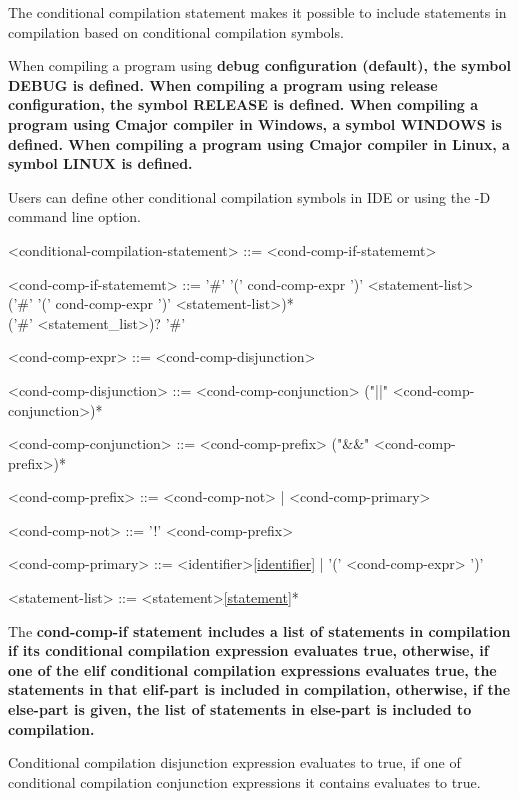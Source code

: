 \documentclass[a4paper,oneside,11pt]{article}
\begin{document}
The conditional compilation statement makes it possible to include statements in compilation
based on conditional compilation symbols.

When compiling a program using \bf{debug} configuration (default), the symbol DEBUG is defined.
When compiling a program using \bf{release} configuration, the symbol RELEASE is defined.
When compiling a program using Cmajor compiler in Windows, a symbol WINDOWS is defined.
When compiling a program using Cmajor compiler in Linux, a symbol LINUX is defined.

Users can define other conditional compilation symbols in IDE or using the -D command line option.

\begin{grammar}
\label{conditional-compilation-statement}<conditional-compilation-statement> ::= <cond-comp-if-statememt>

<cond-comp-if-statememt> ::= '\#'  '(' cond-comp-expr ')' <statement-list>\\
('\#'  '(' cond-comp-expr ')' <statement-list>)*\\
('\#'  <statement_list>)? '\#' 

<cond-comp-expr> ::= <cond-comp-disjunction>

<cond-comp-disjunction> ::= <cond-comp-conjunction> ("||" <cond-comp-conjunction>)*

<cond-comp-conjunction> ::= <cond-comp-prefix> ("&&" <cond-comp-prefix>)*

<cond-comp-prefix> ::= <cond-comp-not> | <cond-comp-primary>

<cond-comp-not> ::= '!' <cond-comp-prefix>

<cond-comp-primary> ::= <identifier>\ref{identifier} | '(' <cond-comp-expr> ')'

<statement-list> ::= <statement>\ref{statement}*
\end{grammar}

The \bf{cond-comp-if} statement includes a list of statements in compilation
if its conditional compilation expression evaluates true,
otherwise, if one of the \bf{elif} conditional compilation expressions evaluates true,
the statements in that \bf{elif}-part is included in compilation, otherwise,
if the \bf{else}-part is given, the list of statements in \bf{else}-part is
included to compilation.

Conditional compilation disjunction expression evaluates to true,
if one of conditional compilation conjunction expressions it contains evaluates to true.
\end{document}
